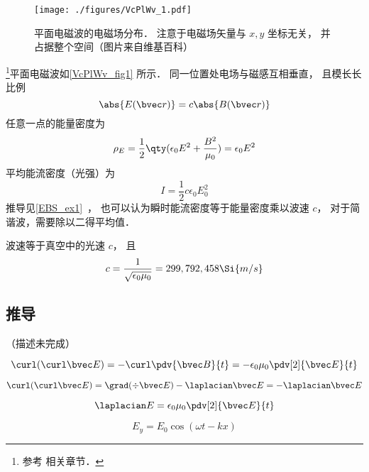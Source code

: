 
\begin{issues}
\issueDraft
\end{issues}


\begin{figure}[ht]
\centering
\texttt{[image: ./figures/VcPlWv\_1.pdf]}
\caption{平面电磁波的电磁场分布． 注意于电磁场矢量与 $x, y$ 坐标无关， 并占据整个空间（图片来自维基百科）} \label{VcPlWv_fig1}
\end{figure}

\footnote{参考 \cite{GriffE} 相关章节．}平面电磁波如\autoref{VcPlWv_fig1} 所示． 同一位置处电场与磁感互相垂直， 且模长长比例
\begin{equation}
\abs{E(\bvec r)} = c\abs{B(\bvec r)}
\end{equation}
任意一点的能量密度为
\begin{equation}\label{VcPlWv_eq2}
\rho_E = \frac{1}{2}\qty(\epsilon_0 E^2 + \frac{B^2}{\mu_0}) = \epsilon_0 E^2
\end{equation}
平均能流密度（光强）为
\begin{equation}
I = \frac12 c\epsilon_0 E_0^2
\end{equation}
推导见\autoref{EBS_ex1}~， 也可以认为瞬时能流密度等于能量密度乘以波速 $c$， 对于简谐波，需要除以二得平均值．

波速等于真空中的光速 $c$， 且
\begin{equation}\label{VcPlWv_eq1}
c = \frac{1}{\sqrt{\epsilon_0\mu_0}} = 299,792,458 \Si{m/s}
\end{equation}

\subsection{推导}
（描述未完成）

\begin{equation}
\curl(\curl \bvec E) = -\curl\pdv{\bvec B}{t} = -\epsilon_0\mu_0 \pdv[2]{\bvec E}{t}
\end{equation}

\begin{equation}
\curl(\curl \bvec E) = \grad(\div \bvec E) - \laplacian \bvec E = - \laplacian \bvec E
\end{equation}

\begin{equation}
\laplacian E = \epsilon_0 \mu_0 \pdv[2]{\bvec E}{t}
\end{equation}

\begin{equation}
E_y = E_0\cos(\omega t - kx)
\end{equation}
